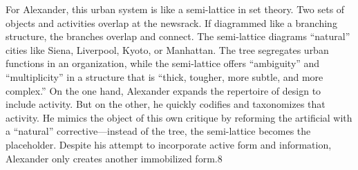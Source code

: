 For Alexander, this urban system is like a semi-lattice in set theory. Two sets of objects and activities overlap at the newsrack. If diagrammed like a branching structure, the branches overlap and connect. The semi-lattice diagrams “natural” cities like Siena, Liverpool, Kyoto, or Manhattan. The tree segregates urban functions in an organization, while the semi-lattice offers “ambiguity” and “multiplicity” in a structure that is “thick, tougher, more subtle, and more complex.” On the one hand, Alexander expands the repertoire of design to include activity. But on the other, he quickly codifies and taxonomizes that activity. He mimics the object of this own critique by reforming the artificial with a “natural” corrective—instead of the tree, the semi-lattice becomes the placeholder. Despite his attempt to incorporate active form and information, Alexander only creates another immobilized form.8
